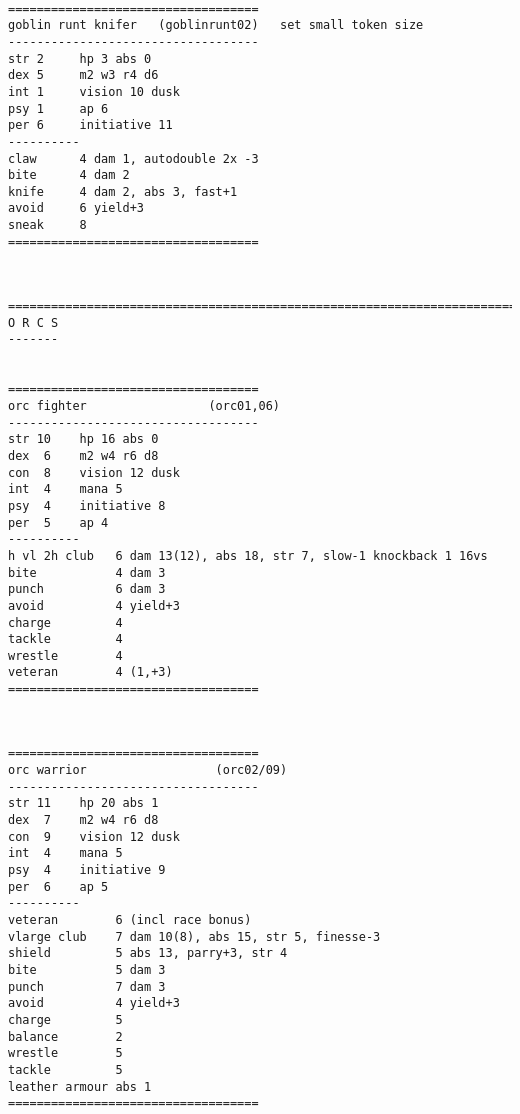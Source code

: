 \

\goodbreak \begin{samepage} \small \begin{verbatim}
===================================
goblin runt knifer   (goblinrunt02)   set small token size
-----------------------------------
str 2     hp 3 abs 0
dex 5     m2 w3 r4 d6
int 1     vision 10 dusk
psy 1     ap 6
per 6     initiative 11
----------
claw      4 dam 1, autodouble 2x -3
bite      4 dam 2
knife     4 dam 2, abs 3, fast+1
avoid     6 yield+3
sneak     8
===================================
\end{verbatim} \normalsize \end{samepage}

\








\clearpage
{}


\goodbreak \begin{samepage} \small \begin{verbatim}
================================================================================
O R C S
-------


===================================
orc fighter                 (orc01,06)
-----------------------------------
str 10    hp 16 abs 0
dex  6    m2 w4 r6 d8
con  8    vision 12 dusk
int  4    mana 5
psy  4    initiative 8
per  5    ap 4
----------
h vl 2h club   6 dam 13(12), abs 18, str 7, slow-1 knockback 1 16vs
bite           4 dam 3
punch          6 dam 3
avoid          4 yield+3
charge         4
tackle         4
wrestle        4
veteran        4 (1,+3)
===================================
\end{verbatim} \normalsize \end{samepage}

\

\goodbreak \begin{samepage} \small \begin{verbatim}
===================================
orc warrior                  (orc02/09)
-----------------------------------
str 11    hp 20 abs 1
dex  7    m2 w4 r6 d8
con  9    vision 12 dusk
int  4    mana 5
psy  4    initiative 9
per  6    ap 5
----------
veteran        6 (incl race bonus)
vlarge club    7 dam 10(8), abs 15, str 5, finesse-3
shield         5 abs 13, parry+3, str 4
bite           5 dam 3
punch          7 dam 3
avoid          4 yield+3
charge         5
balance        2
wrestle        5
tackle         5
leather armour abs 1
===================================
\end{verbatim} \normalsize \end{samepage}

